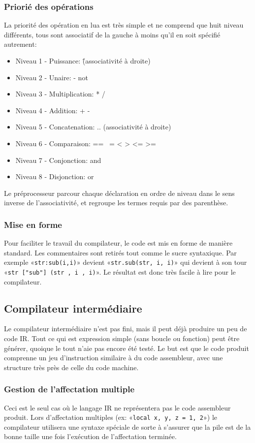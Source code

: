 \documentclass{article}
\begin{document}
\subsubsection{Priorié des opérations}
La priorité des opération en lua est très simple et ne comprend que huit niveau différents, tous sont associatif de la gauche à moins qu'il en soit spécifié autrement:
\begin{itemize}
\item Niveau 1 - Puissance: \^ (associativité à droite)
\item Niveau 2 - Unaire: - not
\item Niveau 3 - Multiplication: * /
\item Niveau 4 - Addition: + -
\item Niveau 5 - Concatenation: .. (associativité à droite)
\item Niveau 6 - Comparaison: == ~= < > <= >=
\item Niveau 7 - Conjonction: and
\item Niveau 8 - Disjonction: or
\end{itemize}
Le préprocesseur parcour chaque déclaration en ordre de niveau dans le sens inverse de l'associativité, et regroupe les termes requis par des parenthèse.
\subsubsection{Mise en forme}
Pour faciliter le travail du compilateur, le code est mis en forme de manière standard. Les commentaires sont retirés tout comme le sucre syntaxique. Par exemple «\texttt{str:sub(i,i)}» devient «\texttt{str.sub(str, i, i)}» qui devient à son tour «\texttt{str ["sub"] (str , i , i)}». Le résultat est donc très facile à lire pour le compilateur.
\subsection{Compilateur intermédiaire}
Le compilateur intermédiaire n'est pas fini, mais il peut déjà produire un peu de code IR. Tout ce qui est expression simple (sans boucle ou fonction) peut être générer, quoique le tout n'aie pas encore été testé. Le but est que le code produit comprenne un jeu d'instruction similaire à du code assembleur, avec une structure très près de celle du code machine.
\subsubsection{Gestion de l'affectation multiple}
Ceci est le seul cas où le langage IR ne représentera pas le code assembleur produit. Lors d'affectation multiples (ex: «\texttt{local x, y, z = 1, 2}») le compilateur utilisera une syntaxe spéciale de sorte à s'assurer que la pile est de la bonne taille une fois l'exécution de l'affectation terminée.
\end{document}
